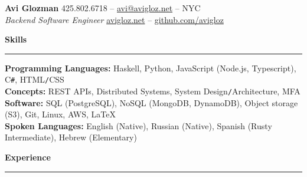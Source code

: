 \documentclass[10pt]{article}
\begin{document}
	\pagestyle{empty}
	\begin{center}
		{\huge \textbf{Avi Glozman}} {\large \hfill 425.802.6718 -- \href{mailto:avi@avigloz.net}{avi@avigloz.net} -- NYC} \\
		{\large \textsl{Backend Software Engineer} \hfill \href{https://avigloz.net}{avigloz.net} -- \href{https://github.com/avigloz}{github.com/avigloz}}
	\end{center}
	
	\begin{flushleft}	
		\vspace{-0.5mm}
		{\large \raggedright \textbf{Skills}}
		\vspace{1.25mm}
	
		\hrule
	
		\vspace{2.25mm}
		\textbf{Programming Languages:} Haskell, Python, JavaScript (Node.js, Typescript), C\verb!#!, HTML\texttt{/}CSS\\
		\vspace{0.5mm}
		\textbf{Concepts:} REST APIs, Distributed Systems, System Design\texttt{/}Architecture, MFA\\
		\vspace{0.5mm}
		\textbf{Software:} SQL (PostgreSQL), NoSQL (MongoDB, DynamoDB), Object storage (S3), Git, Linux, AWS, \LaTeX\\ 
		\vspace{0.5mm}
		\textbf{Spoken Languages:} English (Native), Russian (Native), Spanish (Rusty Intermediate), Hebrew (Elementary)

		\vspace{1.5mm}
		{\large \raggedright \textbf{Experience}}
		\vspace{1.25mm}
	
		\hrule

		\vspace{2.25mm}


\end{flushleft}
\end{document}
